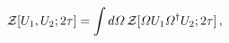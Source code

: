 \begin{equation}
{\cal Z} [U_1, U_2 ; 2 \tau]
=
\int d {\mit\Omega} \,
{\cal Z} [ {\mit\Omega} U_1 {\mit\Omega}^\dagger U_2 ; 2 \tau ]
\, ,
\end{equation}

